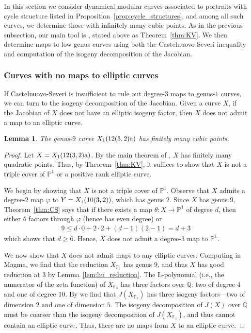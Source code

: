 \documentclass[12pt]{amsart}
\newtheorem{lem}[thm]{Lemma}
\theoremstyle{definition}
\newcommand{\bbF}{\mathbb{F}}
\numberwithin{equation}{section}
\begin{document}
In this section we consider dynamical modular curves associated to portraits with cycle structure listed in Proposition~\ref{prop:cycle_structures}, and among all such curves, we determine those with infinitely many cubic points. 
As in the previous subsection, our main tool is \cite[Theorem 1.2]{kadets/vogt:2025}, stated above as Theorem~\ref{thm:KV}. We then determine maps to low genus curves using both the Castelnuovo-Severi inequality and computation of the isogeny decomposition of the Jacobian.

\subsubsection{Curves with no maps to elliptic curves}

If Castelnuovo-Severi is insufficient to rule out degree-$3$ maps to genus-$1$ curves, we can turn to the isogeny decomposition of the Jacobian. Given a curve $X$, if the Jacobian of $X$ does not have an elliptic isogeny factor, then $X$ does not admit a map to an elliptic curve.

\begin{lem}\label{lem:12(3,2)a}
    The genus-$9$ curve $X_1(\rm 12(3,2)a)$ has finitely many cubic points.
\end{lem}
\begin{proof}
    Let $X = X_1(\rm 12(3,2)a)$. By the main theorem of \cite{doyle/krumm:2024}, $X$ has finitely many quadratic points. Thus, by Theorem~\ref{thm:KV}, it suffices to show that $X$ is not a triple cover of $\mathbb{P}^1$ or a positive rank elliptic curve.

    We begin by showing that $X$ is not a triple cover of $\mathbb{P}^1$. Observe that $X$ admits a degree-$2$ map $\varphi$ to $Y = X_1({\rm 10(3,2)})$, which has genus $2$. Since $X$ has genus $9$, Theorem~\ref{thm:CS} says that if there exists a map $\theta: X \to \mathbb{P}^1$ of degree $d$, then either $\theta$ factors through $\varphi$ (hence has even degree) or
    \begin{align*}
        9 \leq d \cdot 0 + 2 \cdot 2 + (d-1)(2-1) = d + 3
    \end{align*}
    which shows that $d \geq 6$. Hence, $X$ does not admit a degree-$3$ map to $\mathbb{P}^1$.

    We now show that $X$ does not admit maps to any elliptic curves. Computing in Magma, we find that the reduction $X_{\bbF_3}$ has genus $9$, and thus $X$ has good reduction at $3$ by Lemma~\ref{lem:liu_reduction}. The L-polynomial (i.e., the numerator of the zeta function) of $X_{\bbF_3}$ has three factors over $\mathbb{Q}$: two of degree $4$ and one of degree $10$. By \cite[Theorem 7]{milne/waterhouse:1969} we find that $J(X_{\bbF_3})$ has three isogeny factors---two of dimension $2$ and one of dimension $5$. The isogeny decomposition of $J(X)$ over $\mathbb{Q}$ must be coarser than the isogeny decomposition of $J(X_{\bbF_3})$, and thus cannot contain an elliptic curve. Thus, there are no maps from $X$ to an elliptic curve.
\end{proof}
\end{document}
